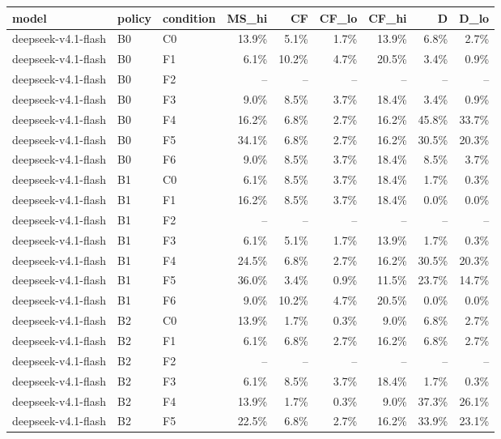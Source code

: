 \begin{tabular}{lllrrrrrr}
\toprule
model & policy & condition & MS\_hi & CF & CF\_lo & CF\_hi & D & D\_lo \\
\midrule
deepseek-v4.1-flash & B0 & C0 & 13.9\% & 5.1\% & 1.7\% & 13.9\% & 6.8\% & 2.7\% \\
deepseek-v4.1-flash & B0 & F1 & 6.1\% & 10.2\% & 4.7\% & 20.5\% & 3.4\% & 0.9\% \\
deepseek-v4.1-flash & B0 & F2 & -- & -- & -- & -- & -- & -- \\
deepseek-v4.1-flash & B0 & F3 & 9.0\% & 8.5\% & 3.7\% & 18.4\% & 3.4\% & 0.9\% \\
deepseek-v4.1-flash & B0 & F4 & 16.2\% & 6.8\% & 2.7\% & 16.2\% & 45.8\% & 33.7\% \\
deepseek-v4.1-flash & B0 & F5 & 34.1\% & 6.8\% & 2.7\% & 16.2\% & 30.5\% & 20.3\% \\
deepseek-v4.1-flash & B0 & F6 & 9.0\% & 8.5\% & 3.7\% & 18.4\% & 8.5\% & 3.7\% \\
deepseek-v4.1-flash & B1 & C0 & 6.1\% & 8.5\% & 3.7\% & 18.4\% & 1.7\% & 0.3\% \\
deepseek-v4.1-flash & B1 & F1 & 16.2\% & 8.5\% & 3.7\% & 18.4\% & 0.0\% & 0.0\% \\
deepseek-v4.1-flash & B1 & F2 & -- & -- & -- & -- & -- & -- \\
deepseek-v4.1-flash & B1 & F3 & 6.1\% & 5.1\% & 1.7\% & 13.9\% & 1.7\% & 0.3\% \\
deepseek-v4.1-flash & B1 & F4 & 24.5\% & 6.8\% & 2.7\% & 16.2\% & 30.5\% & 20.3\% \\
deepseek-v4.1-flash & B1 & F5 & 36.0\% & 3.4\% & 0.9\% & 11.5\% & 23.7\% & 14.7\% \\
deepseek-v4.1-flash & B1 & F6 & 9.0\% & 10.2\% & 4.7\% & 20.5\% & 0.0\% & 0.0\% \\
deepseek-v4.1-flash & B2 & C0 & 13.9\% & 1.7\% & 0.3\% & 9.0\% & 6.8\% & 2.7\% \\
deepseek-v4.1-flash & B2 & F1 & 6.1\% & 6.8\% & 2.7\% & 16.2\% & 6.8\% & 2.7\% \\
deepseek-v4.1-flash & B2 & F2 & -- & -- & -- & -- & -- & -- \\
deepseek-v4.1-flash & B2 & F3 & 6.1\% & 8.5\% & 3.7\% & 18.4\% & 1.7\% & 0.3\% \\
deepseek-v4.1-flash & B2 & F4 & 13.9\% & 1.7\% & 0.3\% & 9.0\% & 37.3\% & 26.1\% \\
deepseek-v4.1-flash & B2 & F5 & 22.5\% & 6.8\% & 2.7\% & 16.2\% & 33.9\% & 23.1\% \\

\end{tabular}
